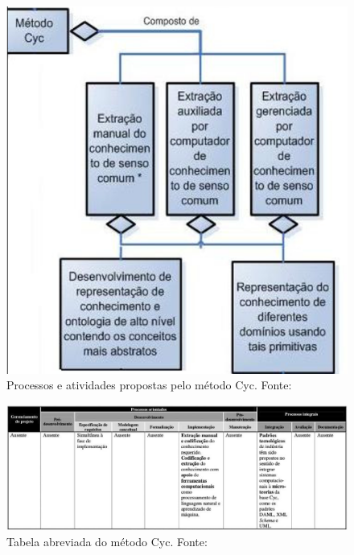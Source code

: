 \begin{figure}[h] 
\centering 
\includegraphics[scale=0.6]{Figuras/1.png} 
\caption[Processos e atividades propostas pelo método Cyc]
{Processos e atividades propostas pelo método Cyc. Fonte: \cite{DanielaLucas2008}}
\label{fig:processos_cyc}
\end{figure}

\begin{figure}[h] 
\centering 
\includegraphics[scale=0.3]{Figuras/2.png}
\caption[Tabela abreviada do método Cyc]{Tabela abreviada do método Cyc. Fonte: \cite{DanielaLucas2008}}
\end{figure}

